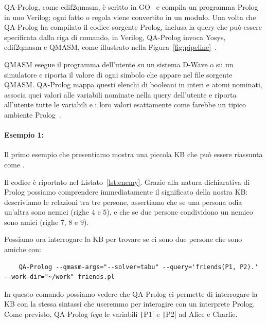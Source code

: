 QA-Prolog, come edif2qmasm, è scritto in GO~\cite{pakin2018performing, pakin2019targeting} e compila un programma Prolog in uno Verilog; ogni fatto o regola viene convertito in un modulo. Una volta che QA-Prolog ha compilato il codice sorgente Prolog, inclusa la query che può essere specificata dalla riga di comando, in Verilog, QA-Prolog invoca Yosys, edif2qmasm e QMASM, come illustrato nella Figura~\ref{fig:pipeline}~\cite{pakin2018performing}.

QMASM esegue il programma dell'utente su un sistema D-Wave o su un simulatore e riporta il valore di ogni simbolo che appare nel file sorgente QMASM. QA-Prolog mappa questi elenchi di booleani in interi e atomi nominati, associa quei valori alle variabili nominate nella query dell'utente e riporta all'utente tutte le variabili e i loro valori esattamente come farebbe un tipico ambiente Prolog~\cite{pakin2018performing}.

\paragraph{Esempio 1: } Il primo esempio che presentiamo mostra una piccola KB che può essere riassunta come . 

\begin{listingenv}[h]
	\caption{KB il nemico del mio nemico è mio amico}
	\label{lst:enemy}
\end{listingenv}

Il codice è riportato nel Listato~\ref{lst:enemy}. Grazie alla natura dichiarativa di Prolog possiamo comprendere immediatamente il significato della nostra KB: descriviamo le relazioni tra tre persone, assertiamo che se una persona odia un'altra sono nemici (righe $4$ e $5$), e che se due persone condividono un nemico sono amici (righe $7$, $8$ e $9$). 

Possiamo ora interrogare la KB per trovare se ci sono due persone che sono amiche con:
\begin{verbatim}
	QA-Prolog --qmasm-args="--solver=tabu" --query='friends(P1, P2).' --work-dir="~/work" friends.pl
\end{verbatim}

In questo comando possiamo vedere che QA-Prolog ci permette di interrogare la KB con la stessa sintassi che useremmo per interagire con un interprete Prolog. Come previsto, QA-Prolog \emph{lega} le variabili \texttt|P1| e \texttt|P2| ad Alice e Charlie.

